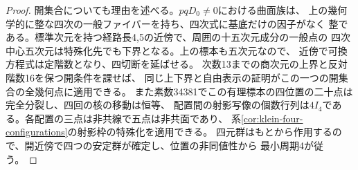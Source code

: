 \begin{proof}
開集合についても理由を述べる。$pqD_0\ne0$における曲面族は、
上の幾何学的に整な四次の一般ファイバーを持ち、四次式に基底だけの因子がなく
整である。標準次元を持つ経路長4,5の近傍で、周囲の十五次元成分の一般点の
四次中心五次元は特殊化先でも下界となる。上の標本も五次元なので、
近傍で可換方程式は定階数となり、四切断を延ばせる。
次数13までの商次元の上界と反対階数16を保つ開条件を課せば、
同じ上下界と自由表示の証明がこの一つの開集合の全幾何点に適用できる。
また素数34381でこの有理標本の四位置の二十点は完全分裂し、四回の核の移動は恒等、
配置間の射影写像の個数行列は$4I_4$である。各配置の三点は非共線で五点は非共面であり、
系\ref{cor:klein-four-configurations}の射影枠の特殊化を適用できる。
四元群はもとから作用するので、開近傍で四つの安定群が確定し、位置の非同値性から
最小周期4が従う。
\end{proof}
